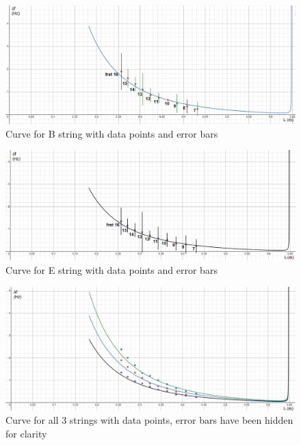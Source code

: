 \begin{figure}[!htb]
    \includegraphics[width = \textwidth]{ee/compare b string.png}
    \caption{Curve for B string with data points and error bars} \label{fig10}
\end{figure}
\begin{figure}[!htb]
    \includegraphics[width = \textwidth]{ee/compare e string.png}
    \caption{Curve for E string with data points and error bars} \label{fig11}
\end{figure}
\begin{figure}[!htb]
    \includegraphics[width = \textwidth]{ee/all 3.png}
    \caption{Curve for all 3 strings with data points, error bars have been hidden for clarity} \label{fig6}
\end{figure}

